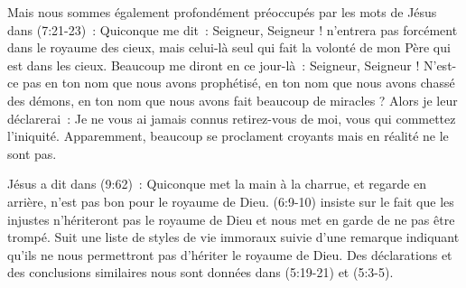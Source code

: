 \begin{enumerate}
\begin{pocketpar}{}
\begin{digestpar}{}
Mais nous sommes également profondément préoccupés par les mots de Jésus dans (7:21-23)~:
 \og Quiconque me dit~: Seigneur, \pocketlinebreak
 Seigneur ! n'entrera pas forcément
 dans le royaume des cieux, mais celui-là seul qui fait la volonté de mon Père
 qui est dans les cieux. Beaucoup me diront en ce jour-là~: Seigneur, Seigneur !
 N'est-ce pas en ton nom que nous avons prophétisé, en ton nom que nous avons
 chassé des démons, en ton nom que nous avons fait beaucoup de miracles ?
 Alors je leur déclarerai~: Je ne vous ai jamais connus retirez-vous de moi,
 vous qui commettez l'iniquité. \fg{}
 Apparemment, beaucoup se proclament croyants mais en réalité ne le sont pas.
\end{digestpar}
\end{pocketpar}

\begin{pocketpar}{}
Jésus a dit dans (9:62)~: \og Quiconque met la main à la charrue,
 et regarde en arrière, n'est pas bon pour le royaume de Dieu. \fg{}
 \BRallowhypbch{}(6:9-10)\BRforbidhypbch{} insiste sur le fait que
 \og les injustes n'hériteront pas le royaume de Dieu \fg{}
 et nous met en garde de ne pas être trompé. 
 Suit une liste de styles de vie immoraux suivie d'une remarque
 indiquant qu'ils ne nous permettront pas d'hériter le royaume de Dieu.
 Des déclarations et des conclusions similaires nous sont données
 dans (5:19-21) et (5:3-5).
\end{pocketpar}


\end{enumerate}
